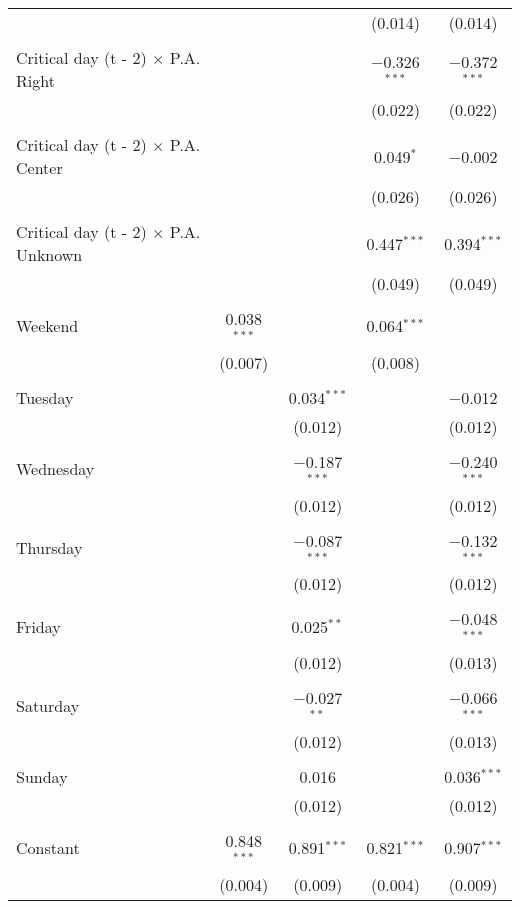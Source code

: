 \documentclass[
]{article}
\begin{document}
\begin{table}[!htbp]
{\begin{tabular}{@{\extracolsep{5pt}}lcccc}
  &  &  & (0.014) & (0.014) \\ 
  & & & & \\ 
 Critical day (t - 2) $\times$ P.A. Right &  &  & $-$0.326$^{***}$ & $-$0.372$^{***}$ \\ 
  &  &  & (0.022) & (0.022) \\ 
  & & & & \\ 
 Critical day (t - 2) $\times$ P.A. Center &  &  & 0.049$^{*}$ & $-$0.002 \\ 
  &  &  & (0.026) & (0.026) \\ 
  & & & & \\ 
 Critical day (t - 2) $\times$ P.A. Unknown &  &  & 0.447$^{***}$ & 0.394$^{***}$ \\ 
  &  &  & (0.049) & (0.049) \\ 
  & & & & \\ 
 Weekend & 0.038$^{***}$ &  & 0.064$^{***}$ &  \\ 
  & (0.007) &  & (0.008) &  \\ 
  & & & & \\ 
 Tuesday &  & 0.034$^{***}$ &  & $-$0.012 \\ 
  &  & (0.012) &  & (0.012) \\ 
  & & & & \\ 
 Wednesday &  & $-$0.187$^{***}$ &  & $-$0.240$^{***}$ \\ 
  &  & (0.012) &  & (0.012) \\ 
  & & & & \\ 
 Thursday &  & $-$0.087$^{***}$ &  & $-$0.132$^{***}$ \\ 
  &  & (0.012) &  & (0.012) \\ 
  & & & & \\ 
 Friday &  & 0.025$^{**}$ &  & $-$0.048$^{***}$ \\ 
  &  & (0.012) &  & (0.013) \\ 
  & & & & \\ 
 Saturday &  & $-$0.027$^{**}$ &  & $-$0.066$^{***}$ \\ 
  &  & (0.012) &  & (0.013) \\ 
  & & & & \\ 
 Sunday &  & 0.016 &  & 0.036$^{***}$ \\ 
  &  & (0.012) &  & (0.012) \\ 
  & & & & \\ 
 Constant & 0.848$^{***}$ & 0.891$^{***}$ & 0.821$^{***}$ & 0.907$^{***}$ \\ 
  & (0.004) & (0.009) & (0.004) & (0.009) \\ 

\end{tabular}}
\end{table}
\end{document}
